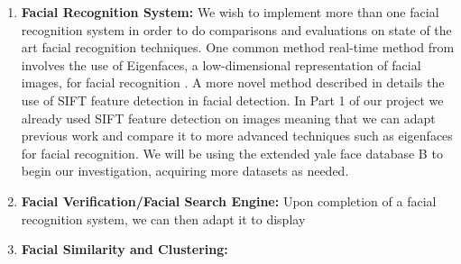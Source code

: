 \documentclass[11pt]{article} %
\theoremstyle{plain}
\theoremstyle{definition}
\theoremstyle{remark}
\numberwithin{equation}{section} %
\numberwithin{figure}{section} %
\numberwithin{table}{section} %
\begin{document}
\begin{enumerate}
  \item \textbf{Facial Recognition System:} We wish to implement more than one facial recognition system in order to do comparisons and evaluations on state of the art facial recognition techniques. One common method real-time method from involves the use of Eigenfaces, a low-dimensional representation of facial images, for facial recognition \citep{turk1991eigenfaces}. A more novel method described in \citep{krivzaj2010adaptation} details the use of SIFT feature detection in facial detection. In Part 1 of our project we already used SIFT feature detection on images meaning that we can adapt previous work and compare it to more advanced techniques such as eigenfaces for facial recognition. We will be using the extended yale face database B to begin our investigation, acquiring more datasets as needed. 

  \item \textbf{Facial Verification/Facial Search Engine:} 
  Upon completion of a facial recognition system, we can then adapt it to display 

  \item \textbf{Facial Similarity and Clustering:}
\end{enumerate}








\end{document}
